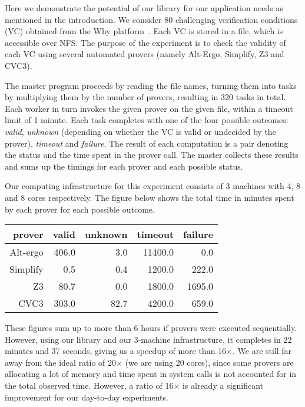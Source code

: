 \documentclass{llncs}
\begin{document}
Here we demonstrate the potential of our library for our application
needs as mentioned in the introduction. 
We consider 80 challenging verification conditions
(VC) obtained from the Why platform~\cite{filliatre07cav}.  Each
VC is stored in a file, which is accessible over
NFS. The purpose of the experiment is to check the validity of each VC
using several automated provers (namely Alt-Ergo, Simplify, Z3 and CVC3).

The master program proceeds by reading the file names, turning them
into tasks by multiplying them by the number of provers, resulting in
320 tasks in total.
Each worker in turn invokes the given prover on the given file, within
a timeout limit of 1 minute.
Each task completes with one of the four possible outcomes: \emph{valid},
\emph{unknown} (depending on
whether the VC is valid or undecided by the prover), 
\emph{timeout} and \emph{failure}.
The result of each computation is a pair denoting the status and the
time spent in the prover call. The master collects these results and
sums up the timings for each prover and each possible status.

Our computing
infrastructure for this experiment consists of 3 machines with 4, 8 and 8 cores
respectively. 
The figure below shows the total time in minutes spent by each prover
for each possible outcome.
\begin{center}
  \begin{tabular}{|r||r|r|r|r|}
    \hline
    prover   & valid & unknown & timeout & failure
    \\\hline\hline
    Alt-ergo & 406.0 & 3.0   &  11400.0 & 0.0       
    \\\hline
    Simplify &  0.5   & 0.4   &  1200.0 & 222.0   
    \\\hline
    Z3       & 80.7   & 0.0   &  1800.0 & 1695.0   
    \\\hline
    CVC3     & 303.0  & 82.7  &  4200.0 & 659.0   
    \\\hline
  \end{tabular}
\end{center}
These figures sum up to more than 6 hours if provers were executed
sequentially. However, using our library and our 3-machine
infrastructure, it completes in 22 minutes and 37 seconds, giving us a
speedup of more than 16$\times$. We are still far away from the ideal
ratio of 20$\times$ (we are using 20 cores), since some provers are
allocating a lot of memory and time spent in system calls is not
accounted for in the total observed time. However, a ratio of
16$\times$ is already a significant improvement for our day-to-day
experiments. 
\end{document}
